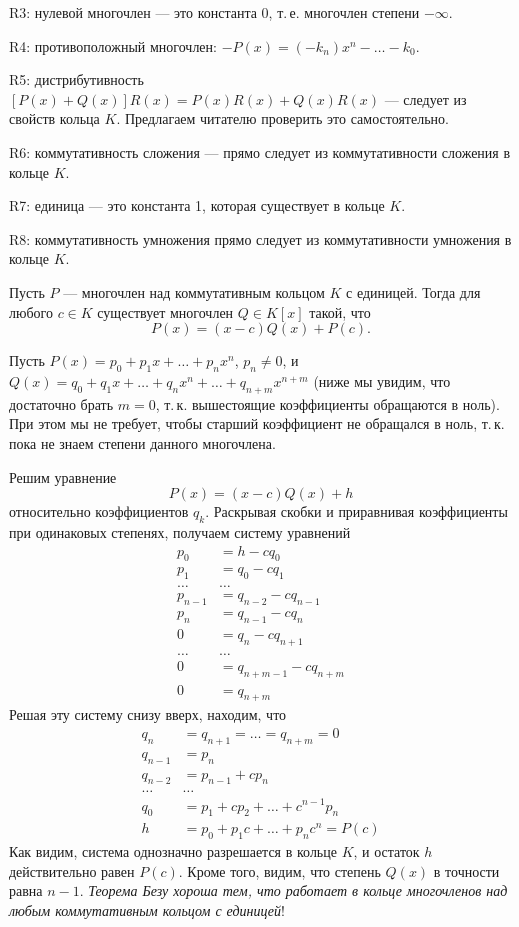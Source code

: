 \begin{enumerate}
R3: нулевой многочлен --- это константа 0, т.\,е. многочлен степени $-\infty$.

R4: противоположный многочлен: $-P(x)=(-k_n)x^n-\dots-k_0$.

R5: дистрибутивность $[P(x)+Q(x)]R(x) = P(x)R(x) + Q(x)R(x)$ --- следует из свойств кольца $K$. Предлагаем читателю проверить это самостоятельно.

R6: коммутативность сложения --- прямо следует из коммутативности сложения в кольце $K$.

R7: единица --- это константа 1, которая существует в кольце $K$.

R8: коммутативность умножения прямо следует из коммутативности умножения в кольце $K$.


\begin{thrm}[Без\'y]
Пусть $P$ --- многочлен над коммутативным кольцом $K$ с единицей. Тогда для любого $c\in K$ существует многочлен $Q\in K[x]$ такой, что
$$
P(x) = (x-c)Q(x) + P(c).
$$
\end{thrm}
\pf
Пусть $P(x)=p_0+p_1x+\dots+p_nx^n$, $p_n\ne 0$, и $Q(x)=q_0+q_1x+\dots+q_nx^n+\dots+q_{n+m}x^{n+m}$ (ниже мы увидим, что достаточно брать $m=0$, т.\,к. вышестоящие коэффициенты обращаются в ноль). При этом мы не требует, чтобы старший коэффициент не обращался в ноль, т.\,к. пока не знаем степени данного многочлена.

Решим уравнение
$$
P(x) = (x-c)Q(x) + h
$$
относительно коэффициентов $q_k$. Раскрывая скобки и приравнивая коэффициенты при одинаковых степенях, получаем систему уравнений
\begin{align*}
p_0 & = h-cq_0 \\
p_1 & = q_0-cq_1 \\
\dots & \dots \\
p_{n-1} & = q_{n-2}-cq_{n-1} \\
p_n & = q_{n-1}-cq_n \\
0 & =  q_n-cq_{n+1} \\
\dots & \dots \\
0 & = q_{n+m-1}-cq_{n+m} \\
0 & = q_{n+m}
\end{align*}
Решая эту систему снизу вверх, находим, что
\begin{align*}
q_n & = q_{n+1}=\dots=q_{n+m}=0 \\
q_{n-1} & = p_n \\
q_{n-2} & = p_{n-1} + c p_n \\
\dots & \dots \\
q_0 & = p_1+cp_2+\dots +c^{n-1}p_n \\
h & =  p_0 + p_1c+\dots +p_nc^n = P(c)
\end{align*}
Как видим, система однозначно разрешается в кольце $K$, и остаток $h$ действительно равен $P(c)$. Кроме того, видим, что степень $Q(x)$ в точности равна $n-1$.
\epf
\textit{Теорема Безу хороша тем, что работает в кольце многочленов над любым коммутативным кольцом с единицей}!


\end{enumerate}

